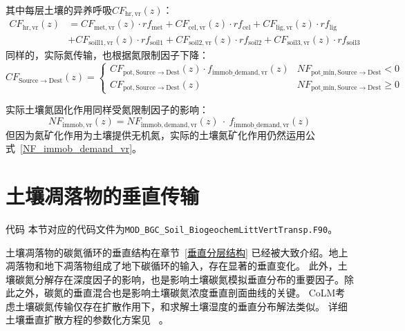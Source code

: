 其中每层土壤的异养呼吸$CF_{\mathrm{hr,vr}}\left(z\right)$：
\begin{equation}
  \begin{aligned}
    C F_{\mathrm{h r, vr}}(z)&=C F_{\mathrm{met, vr}}(z) \cdot r f_{\mathrm{met}}+C F_{\mathrm{cel, vr}}(z) \cdot r f_{\mathrm{cel}}+C F_{\mathrm{lig, vr}}(z) \cdot r f_{\mathrm{lig}} \\
    &+C F_{\mathrm{{soill } 1, vr}}(z) \cdot r f_{\mathrm{{soil1 }}}+C F_{\mathrm{{soil2,vr }}}(z) \cdot r f_{\mathrm{{soil2 }}}+C F_{\mathrm{{soil3,vr }}}(z) \cdot r f_{\mathrm{{soil3 }}}
  \end{aligned}
\end{equation}
同样的，实际氮传输，也根据氮限制因子下降：
\begin{equation}
  CF_{\mathrm{Source \rightarrow Dest}}(z)=\left\{\begin{array}{ll} CF_{\mathrm{pot, Source \rightarrow Dest}}(z) \cdot f_{\mathrm{immob\_demand, vr}}(z) & NF_{\mathrm{pot\_{min, Source \rightarrow Dest}}} <0 \\
      CF_{\mathrm{pot, Source \rightarrow Dest}}(z) & NF_{\mathrm{pot\_{min, Source\rightarrow Dest}}} \geqslant 0
  \end{array}\right.
\end{equation}

实际土壤氮固化作用同样受氮限制因子的影响：
\begin{equation}
  NF_{\mathrm{immob,vr}}(z)=NF_{\mathrm{immob,demand,vr}}(z)\ \cdot\ f_{\mathrm{immob\_{demand},vr}}(z)
\end{equation}
但因为氮矿化作用为土壤提供无机氮，实际的土壤氮矿化作用仍然运用公式~\eqref{NF_immob_demand_vr}。


\section{土壤凋落物的垂直传输}\label{土壤凋落物的垂直传输}
\begin{mymdframed}{代码}
  本节对应的代码文件为\texttt{MOD\_BGC\_Soil\_BiogeochemLittVertTransp.F90}。
\end{mymdframed}
土壤凋落物的碳氮循环的垂直结构在章节~\ref{垂直分层结构} 已经被大致介绍。地上凋落物和地下凋落物组成了地下碳循环的输入，存在显著的垂直变化。
此外，土壤碳氮分解存在深度因子的影响，也是影响土壤碳氮模拟垂直分布的重要因子。除此之外，碳氮的垂直混合也是影响土壤碳氮浓度垂直剖面曲线的关键。
CoLM考虑土壤碳氮传输仅存在扩散作用下，和求解土壤湿度的垂直分布解法类似。
详细土壤垂直扩散方程的参数化方案见~\citet{koven2009formation,koven2011permafrost,koven2013effect,koven2015permafrost} 。
